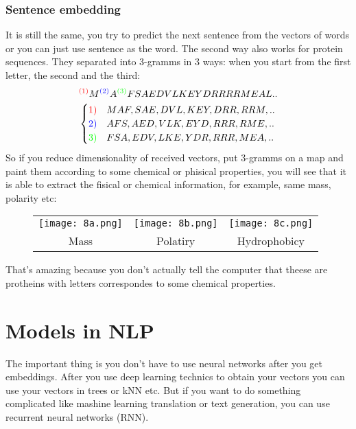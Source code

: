 \subsubsection*{Sentence embedding}

It is still the same, you try to predict the next sentence from the vectors of words or you can just use sentence as the word.
The second way also works for protein sequences. They separated into 3-gramms in 3 ways: when you start from the first letter, the second and the third:
$$^{\color{red}(1)}M^{\color{blue}(2)}A^{\color{green}(3)}FSAEDVLKEYDRRRRMEAL..$$
$$\begin{cases}
	{\color{red} 1)} & MAF,SAE,DVL,KEY,DRR,RRM,..\\
	{\color{blue} 2)} & AFS,AED,VLK,EYD,RRR,RME,..\\
	{\color{green} 3)} & FSA,EDV,LKE,YDR,RRR,MEA,..\\
\end{cases}$$
So if you reduce dimensionality of received vectors, put 3-gramms on a map and paint them according to some chemical or phisical properties, you will see that it is able to extract the fisical or chemical information, for example, same mass, polarity etc:\\
\begin{figure}[h]
  \centering
  \begin{tabular}{ccc}
    \texttt{[image: 8a.png]} & \hspace{0.5cm}
    \texttt{[image: 8b.png]} & \hspace{0.5cm}
    \texttt{[image: 8c.png]} \\
    Mass & Polatiry & Hydrophobicy \\
  \end{tabular}
\end{figure}
That's amazing because you don't actually tell the computer that theese are protheins with letters correspondes to some chemical properties.

\section{Models in NLP}

The important thing is you don't have to use neural networks after you get embeddings. After you use deep learning technics to obtain your vectors you can use your vectors in trees or kNN etc. But if you want to do something complicated like mashine learning translation or text generation, you can use recurrent neural networks (RNN).

